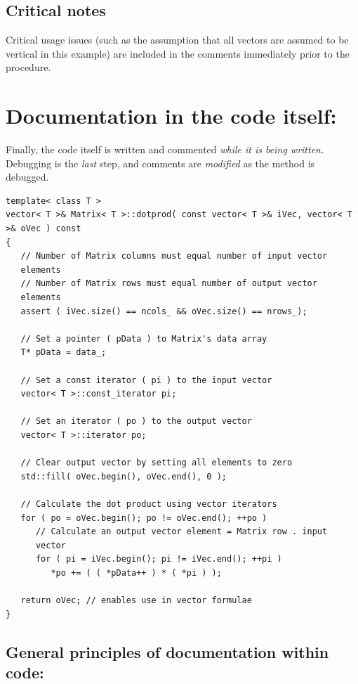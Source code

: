 \documentclass{report}
\begin{document}
\subsection{Critical notes}

Critical usage issues (such as the assumption that all vectors are
assumed to be vertical in this example) are included in the comments
immediately prior to the procedure.

\section{Documentation in the code itself:}

Finally, the code itself is written and commented {\em while it is
being written.}  Debugging is the {\em last} step, and comments are
{\em modified} as the method is debugged.

\begin{verbatim}
template< class T >
vector< T >& Matrix< T >::dotprod( const vector< T >& iVec, vector< T
>& oVec ) const
{
   // Number of Matrix columns must equal number of input vector
   elements
   // Number of Matrix rows must equal number of output vector
   elements
   assert ( iVec.size() == ncols_ && oVec.size() == nrows_);

   // Set a pointer ( pData ) to Matrix's data array
   T* pData = data_;

   // Set a const iterator ( pi ) to the input vector
   vector< T >::const_iterator pi;

   // Set an iterator ( po ) to the output vector
   vector< T >::iterator po;

   // Clear output vector by setting all elements to zero
   std::fill( oVec.begin(), oVec.end(), 0 );

   // Calculate the dot product using vector iterators
   for ( po = oVec.begin(); po != oVec.end(); ++po )
      // Calculate an output vector element = Matrix row . input
      vector
      for ( pi = iVec.begin(); pi != iVec.end(); ++pi )
         *po += ( ( *pData++ ) * ( *pi ) );

   return oVec; // enables use in vector formulae
}
\end{verbatim}

\subsection{General principles of documentation within code:}
\end{document}
